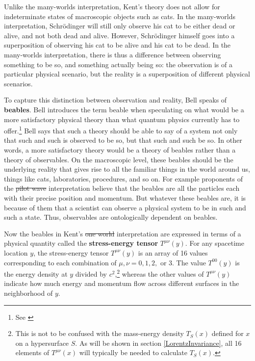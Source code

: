 \documentclass[12pt]{report}
\providecommand{\DIFadd}[1]{{\protect\color{blue}\uwave{#1}}} %
\providecommand{\DIFdel}[1]{{\protect\color{red}\sout{#1}}}                      %
\providecommand{\DIFaddbegin}{} %
\providecommand{\DIFaddend}{} %
\providecommand{\DIFdelbegin}{} %
\providecommand{\DIFdelend}{} %
\begin{document}
 Unlike the many-worlds interpretation, Kent's theory does not allow for indeterminate states of macroscopic objects such as cats. In the many-worlds interpretation, Schr\"{o}dinger will still only observe his cat to be either dead or alive, and not both dead and alive. However, Schr\"{o}dinger himself goes into a superposition of observing his cat to be alive and his cat to be dead. In the many-worlds interpretation, there is thus a difference between observing something to be so, and something actually being so: the observation is of a particular physical scenario, but the reality is a superposition of different physical scenarios. 

To capture this distinction between observation and reality, Bell speaks of \textbf{beables}.\label{beabledef} Bell introduces the term beable when speculating on what would be a more satisfactory physical theory than what quantum physics currently has to offer.\footnote{See \cite{Bell2}} Bell says that such a theory should be able to say of a system not only that such and such is observed to be so, but that such and such be so. In other words, a more satisfactory theory would be a theory of beables rather than a theory of observables. On the macroscopic level, these beables should be the underlying reality that gives rise to all the familiar things in the world around us, things like cats, laboratories, procedures, and so on. For example proponents of the \DIFdelbegin \DIFdel{pilot wave }\DIFdelend \DIFaddbegin \DIFadd{Bohmian }\DIFaddend interpretation believe that the beables are all the particles each with their precise position and momentum. But whatever these beables are, it is because of them that a scientist can observe a physical system to be in such and such a state. Thus, observables are ontologically dependent on beables.   

Now the beables in Kent's \DIFdelbegin \DIFdel{one world }\DIFdelend \DIFaddbegin \DIFadd{one-world }\DIFaddend interpretation are expressed in terms of a physical quantity called the \textbf{stress-energy tensor}  $T^{\mu\nu}(y)$.\label{stressenergy}   %
%
For any spacetime location $y$, the stress-energy tensor $T^{\mu\nu}(y)$ is an array of 16 values corresponding to each combination of $\mu, \nu=0,1,2,$ or $3$. %
%
 The value $T^{00}(y)$ is the energy density at $y$ divided by $c^2$,\footnote{This is not to be confused with the mass-energy density $T_S(x)$ defined for $x$ on a hypersurface $S$. As will be shown in section \ref{LorentzInvariance},   all 16 elements of $T^{\mu\nu}(x)$ will typically be needed to calculate $T_S(x)$.} whereas the other values of $T^{\mu\nu}(y)$ indicate how much energy and momentum flow across different surfaces in the neighborhood of $y$. 
\end{document}
